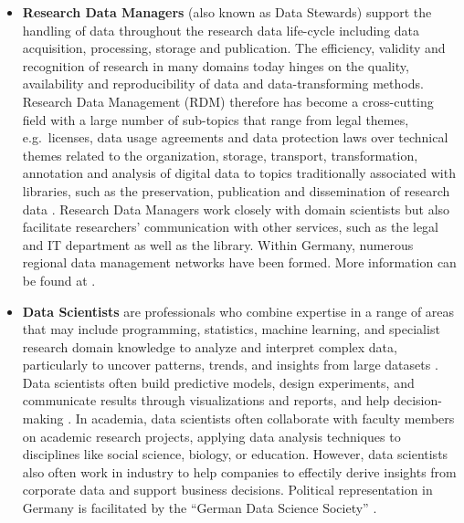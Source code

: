 \documentclass[
        english,biblatex
    ]{lni}
\begin{document}
    \begin{itemize}
    \item
      \textbf{Research Data Managers} (also known as Data Stewards)
      support the handling of data throughout the research data
      life-cycle including data acquisition, processing, storage and
      publication. The efficiency, validity and recognition of research
      in many domains today hinges on the quality, availability and
      reproducibility of data and data-transforming methods. Research
      Data Management (RDM) therefore has become a cross-cutting field
      with a large number of sub-topics that range from legal themes,
      e.g.~licenses, data usage agreements and data protection laws over
      technical themes related to the organization, storage, transport,
      transformation, annotation and analysis of digital data to topics
      traditionally associated with libraries, such as the preservation,
      publication and dissemination of research data
      \autocite{Gruber2021,Jetten2021}. Research Data Managers work
      closely with domain scientists but also facilitate researchers'
      communication with other services, such as the legal and IT
      department as well as the library. Within Germany, numerous
      regional data management networks have been formed. More
      information can be found at \autocite{fdminfo}.
    \item
      \textbf{Data Scientists} are professionals who combine expertise
      in a range of areas that may include programming, statistics,
      machine learning, and specialist research domain knowledge to
      analyze and interpret complex data, particularly to uncover
      patterns, trends, and insights from large datasets
      \autocite{Steinmann2021Verzahnung}. Data scientists often build
      predictive models, design experiments, and communicate results
      through visualizations and reports, and help decision-making
      \autocite{George2016Big}. In academia, data scientists often
      collaborate with faculty members on academic research projects,
      applying data analysis techniques to disciplines like social
      science, biology, or education. However, data scientists also
      often work in industry to help companies to effectily derive
      insights from corporate data and support business decisions.
      Political representation in Germany is facilitated by the ``German
      Data Science Society'' \autocite{gds}.
    \end{itemize}
\end{document}

